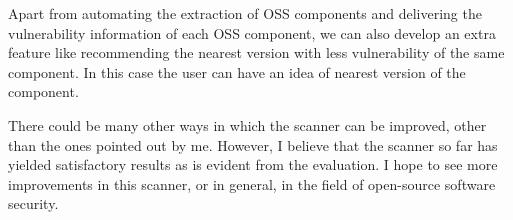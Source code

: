 Apart from automating the extraction of \acs{OSS} components and delivering the vulnerability information of each \acs{OSS} component, we can also develop an extra feature like recommending the nearest version with less vulnerability of the same component. In this case the user can have an idea of nearest version of the component.

There could be many other ways in which the scanner can be improved, other than the ones pointed out by me. However, I believe that the scanner so far has yielded satisfactory results as is evident from the evaluation. I hope to see more improvements in this scanner, or in general, in the field of open-source software security.
%